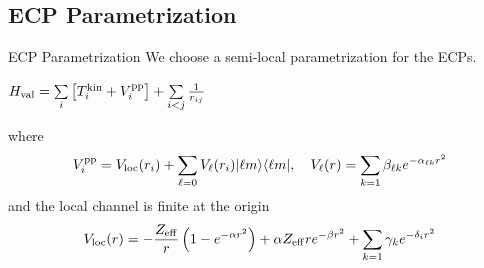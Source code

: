 \begin{frame}
\end{frame}

\subsection{ECP Parametrization}
\begin{frame}
    \begin{block}
	{ECP Parametrization}
	We choose a semi-local parametrization for the ECPs.\\ 
    \end{block}
    \begin{center}
        \begin{tcolorbox}[enhanced,drop lifted shadow,boxrule=0.1pt,colback=blue!15,width=0.41\textwidth]
            $H_{\rm val} = \sum\limits_i \left[ T_i^{\rm kin}+ V_i^{\rm pp} \right] +  \sum\limits_{i<j}\frac{1}{r_{ij}}$
        \end{tcolorbox}
    \end{center}
    where 
    \begin{equation*}
	V_i^{\rm pp} = V_{\rm loc}(r_i) + \sum\limits_{\ell = 0} V_{\ell}(r_i) | \ell m \rangle \langle \ell m |, \quad V_\ell(r) = \sum_{k=1} \beta_{\ell k} e^{-\alpha_{\ell k}r^2}
    \end{equation*}
    and the local channel is finite at the origin
    \begin{equation*}
	V_{\rm loc}(r) = -\frac{Z_{\rm eff}}{r}\left( 1-e^{-\alpha r^2} \right) + \alpha Z_{\rm eff} r e^{-\beta r^2} + \sum_{k=1} \gamma_k e^{-\delta_i r^2}
    \end{equation*}
\end{frame}

